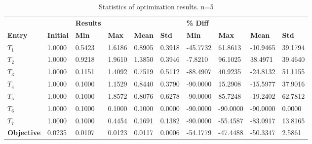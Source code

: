 \begin{table}[H]
\centering
\begin{tabular}{llllllllll}
\textbf{} & \textbf{} & \cellcolor[HTML]{EFEFEF}\textbf{Results} & \cellcolor[HTML]{EFEFEF} & \cellcolor[HTML]{EFEFEF} & \cellcolor[HTML]{EFEFEF} & \cellcolor[HTML]{EFEFEF}\textbf{\% Diff} & \cellcolor[HTML]{EFEFEF} & \cellcolor[HTML]{EFEFEF} & \cellcolor[HTML]{EFEFEF} \\
\rowcolor[HTML]{EFEFEF} 
\textbf{Entry} & \textbf{Initial} & \textbf{Min} & \textbf{Max} & \textbf{Mean} & \textbf{Std} & \textbf{Min} & \textbf{Max} & \textbf{Mean} & \textbf{Std} \\
$T_1$ & 1.0000 & 0.5423 & 1.6186 & 0.8905 & 0.3918 & -45.7732 & 61.8613 & -10.9465 & 39.1794 \\ 
$T_2$ & 1.0000 & 0.9218 & 1.9610 & 1.3850 & 0.3946 & -7.8210 & 96.1025 & 38.4971 & 39.4640 \\ 
$T_3$ & 1.0000 & 0.1151 & 1.4092 & 0.7519 & 0.5112 & -88.4907 & 40.9235 & -24.8132 & 51.1155 \\ 
$T_4$ & 1.0000 & 0.1000 & 1.1529 & 0.8440 & 0.3790 & -90.0000 & 15.2908 & -15.5977 & 37.9016 \\ 
$T_5$ & 1.0000 & 0.1000 & 1.8572 & 0.8076 & 0.6278 & -90.0000 & 85.7248 & -19.2402 & 62.7812 \\ 
$T_6$ & 1.0000 & 0.1000 & 0.1000 & 0.1000 & 0.0000 & -90.0000 & -90.0000 & -90.0000 & 0.0000 \\ 
$T_7$ & 1.0000 & 0.1000 & 0.4454 & 0.1691 & 0.1382 & -90.0000 & -55.4587 & -83.0917 & 13.8165 \\ 
\rowcolor[HTML]{EFEFEF} 
\textbf{Objective} & 0.0235 & 0.0107 & 0.0123 & 0.0117 & 0.0006 & -54.1779 & -47.4488 & -50.3347 & 2.5861 \\ 
\end{tabular}
\caption{Statistics of optimization results. n=5}
\label{tab:StatisticsOptimizationAnalysis}
\end{table}